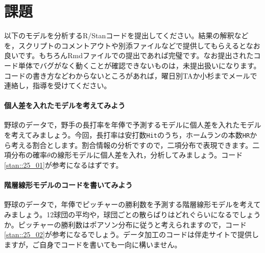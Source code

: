 \documentclass{ltjsbook}
\begin{document}
\section{課題}
以下のモデルを分析するR/Stanコードを提出してください。結果の解釈などを，スクリプトのコメントアウトや別添ファイルなどで提供してもらえるとなお良いです。もちろんRmdファイルでの提出であれば完璧です。なお提出されたコード単体でバグがなく動くことが確認できないものは，未提出扱いになります。コードの書き方などわからないところがあれば，曜日別TAか小杉までメールで連絡し，指導を受けてください。

\paragraph{個人差を入れたモデルを考えてみよう}
野球のデータで，野手の長打率を年俸で予測するモデルに個人差を入れたモデルを考えてみましょう。今回，長打率は安打数\verb|Hit|のうち，ホームランの本数\verb|HR|から考える割合とします。割合情報の分析ですので，二項分布で表現できます。二項分布の確率$\theta$の線形モデルに個人差を入れ，分析してみましょう。コード\ref{stan::25_01}が参考になるはずです。
\paragraph{階層線形モデルのコードを書いてみよう}
野球のデータで，年俸でピッチャーの勝利数を予測する階層線形モデルを考えてみましょう。12球団の平均や，球団ごとの散らばりはどれぐらいになるでしょうか。ピッチャーの勝利数はポアソン分布に従うと考えられますので，コード\ref{stan::25_02}が参考になるでしょう。データ加工のコードは伴走サイトで提供しますが，ご自身でコードを書いても一向に構いません。
\end{document}
